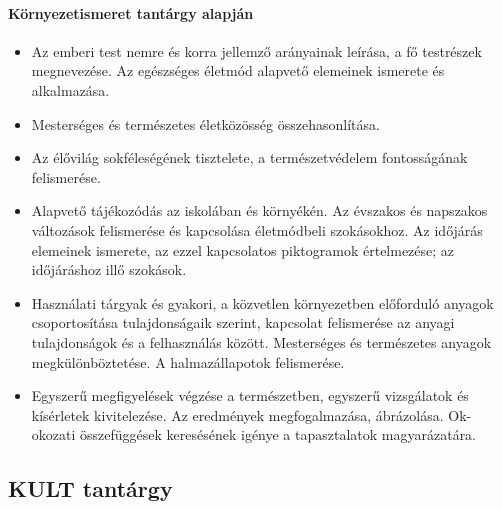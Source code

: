 \paragraph{Környezetismeret tantárgy alapján}
\begin{itemize}
\item Az emberi test nemre és korra jellemző arányainak leírása, a fő testrészek megnevezése. Az egészséges életmód alapvető elemeinek ismerete és alkalmazása.
\item Mesterséges és természetes életközösség összehasonlítása.
\item Az élővilág sokféleségének tisztelete, a természetvédelem fontosságának felismerése.
\item Alapvető tájékozódás az iskolában és környékén. Az évszakos és napszakos változások felismerése és kapcsolása életmódbeli szokásokhoz. Az időjárás elemeinek ismerete, az ezzel kapcsolatos piktogramok értelmezése; az időjáráshoz illő szokások.
\item Használati tárgyak és gyakori, a közvetlen környezetben előforduló anyagok csoportosítása tulajdonságaik szerint, kapcsolat felismerése az anyagi tulajdonságok és a felhasználás között. Mesterséges és természetes anyagok megkülönböztetése. A halmazállapotok felismerése.
\item Egyszerű megfigyelések végzése a természetben, egyszerű vizsgálatok és kísérletek kivitelezése. Az eredmények megfogalmazása, ábrázolása. Ok-okozati összefüggések keresésének igénye a tapasztalatok magyarázatára.
\end{itemize}
\subsection{KULT tantárgy}
